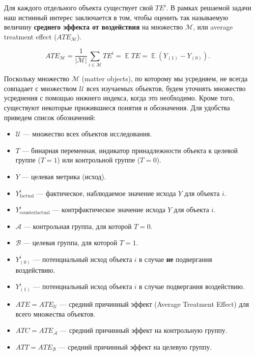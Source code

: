 \documentclass{article}
\DeclareMathOperator{\E}{\mathbb{E}}
\begin{document}
        Для каждого отдельного объекта существует свой $TE^i$.
        В рамках решаемой задачи наш истинный интерес заключается в том, чтобы оценить так называемую величину \textbf{среднего эффекта от воздействия} на множество $\mathcal{M}$, или average treatment effect ($ATE_\mathcal{M}$).

        \[
        ATE_{\mathcal{M}}=
        \frac{1}{|\mathcal{M}|} \displaystyle\sum_{i\in\mathcal{M}}TE^i=
        \E{}TE=
        \E{}(Y_{(1)}-Y_{(0)}).
        \]

        Поскольку множество $\mathcal{M}$ (matter objects), по которому мы усредняем, не всегда совпадает с множеством $\mathcal{U}$ всех изучаемых объектов, будем уточнять множество усреднения с помощью нижнего индекса, когда это необходимо.
        Кроме того, существуют некоторые прижившиеся понятия и обозначения.
        Для удобства приведем список обозначений:

        \begin{itemize}
            \item $\mathcal{U}$ --- множество всех объектов исследования.
            \item $T$ --- бинарная переменная, индикатор принадлежности объекта к целевой группе ($T=1$) или контрольной группе ($T=0$).
            \item $Y$ --- целевая метрика (исход).
            \item $Y^i_{\text{factual}}$ --- фактическое, наблюдаемое значение исхода $Y$ для объекта $i$.
            \item $Y^i_{\text{counterfactual}}$ --- контрфактическое значение исхода $Y$ для объекта $i$.
            \item $\mathcal{A}$ --- контрольная группа, для которой $T = 0$.
            \item $\mathcal{B}$ --- целевая группа, для которой $T = 1$.
            \item $Y^i_{(0)}$ --- потенциальный исход объекта $i$ в случае \textbf{не} подвергания воздействию.
            \item $Y^i_{(1)}$ --- потенциальный исход объекта $i$ в случае подвергания воздействию.
            \item $ATE = ATE_\mathcal{U}$ --- средний причинный эффект (Average Treatment Effect) для всего множества объектов.
            \item $ATC = ATE_\mathcal{A}$ --- средний причинный эффект на контрольную группу.
            \item $ATT = ATE_\mathcal{B}$ --- средний причинный эффект на целевую группу.
        \end{itemize}
\end{document}
